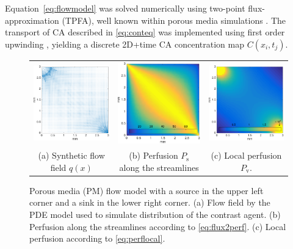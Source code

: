 \documentclass[journal,twocolumn]{IEEEtran}
\newcommand{\Perfv}{P_{\mathrm{v}}}
\newcommand{\Perfs}{P_{\mathrm{s}}}
\begin{document}
	Equation~\eqref{eq:flowmodel} was solved numerically using two-point flux-approximation (TPFA), well known within porous media simulations \cite{Aarnes2007}.
	The transport of CA described in \eqref{eq:conteq} was implemented using first order upwinding \cite{Patankar80}, yielding a discrete 2D+time CA concentration map $C(x_i,t_j)$.
		
\begin{figure}[h!tb]
	\centering
	\begin{tabular}{c c c}
		\includegraphics[width=.3\textwidth]{figs/qmat.pdf} & \includegraphics[width=.3\textwidth]{figs/perfmat.pdf} & \includegraphics[width=.3\textwidth]{figs/lperfmat.pdf}\\
		(a) Synthetic flow field $q(x)$ & (b) Perfusion $\Perfs$ along the streamlines  & (c) Local perfusion $\Perfv$.
	\end{tabular}
	\caption{Porous media (PM) flow model with a source in the upper left corner and a sink in the lower right corner. (a) Flow field by the PDE model used to simulate distribution of the contrast agent. (b) Perfusion along the streamlines according to \eqref{eq:flux2perf}. (c) Local perfusion according to \eqref{eq:perflocal}.}
        \label{fig:flowpressureperfusion}
\end{figure}
\end{document}
